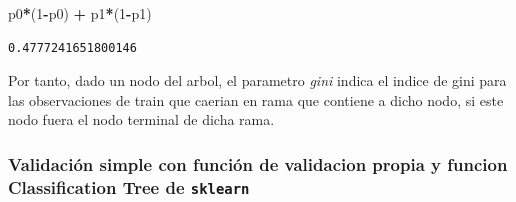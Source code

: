 \documentclass[
  11pt,
  a4paper,
]{article}
\newenvironment{Shaded}{\begin{snugshade}}{\end{snugshade}}
\newcommand{\DecValTok}[1]{\textcolor[rgb]{0.00,0.00,0.81}{#1}}
\newcommand{\NormalTok}[1]{#1}
\newcommand{\OperatorTok}[1]{\textcolor[rgb]{0.81,0.36,0.00}{\textbf{#1}}}
\begin{document}
\begin{Shaded}
\begin{Highlighting}[]
\NormalTok{p0}\OperatorTok{*}\NormalTok{(}\DecValTok{1}\OperatorTok{{-}}\NormalTok{p0) }\OperatorTok{+}\NormalTok{ p1}\OperatorTok{*}\NormalTok{(}\DecValTok{1}\OperatorTok{{-}}\NormalTok{p1)}
\end{Highlighting}
\end{Shaded}

\begin{verbatim}
0.4777241651800146
\end{verbatim}

Por tanto, dado un nodo del arbol, el parametro \emph{gini} indica el
indice de gini para las observaciones de train que caerian en rama que
contiene a dicho nodo, si este nodo fuera el nodo terminal de dicha
rama.

\newpage

\hypertarget{validaciuxf3n-simple-con-funciuxf3n-de-validacion-propia-y-funcion-classification-tree-de-sklearn}{%
\subsubsection{\texorpdfstring{Validación simple con función de
validacion propia y funcion Classification Tree de
\texttt{sklearn}}{Validación simple con función de validacion propia y funcion Classification Tree de sklearn}}\label{validaciuxf3n-simple-con-funciuxf3n-de-validacion-propia-y-funcion-classification-tree-de-sklearn}}
\end{document}
